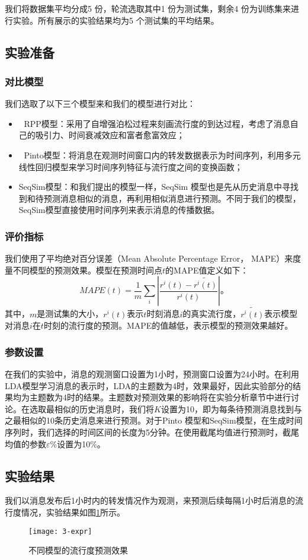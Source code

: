 我们将数据集平均分成5 份，轮流选取其中1 份为测试集，剩余4 份为训练集来进行实验。所有展示的实验结果均为5 个测试集的平均结果。
\subsection{实验准备}
\subsubsection{对比模型}
我们选取了以下三个模型来和我们的模型进行对比：
\begin{itemize}
\item 	RPP模型\citep{shen2014modeling}：采用了自增强泊松过程来刻画流行度的到达过程，考虑了消息自己的吸引力、时间衰减效应和富者愈富效应；
\item 	Pinto模型\citep{pinto2013using}：将消息在观测时间窗口内的转发数据表示为时间序列，利用多元线性回归模型来学习时间序列特征与流行度之间的变换函数；
\item SeqSim模型：和我们提出的模型一样，SeqSim 模型也是先从历史消息中寻找到和待预测消息相似的消息，再利用相似消息进行预测。不同于我们的模型，SeqSim模型直接使用时间序列来表示消息的传播数据。
\end{itemize}
\subsubsection{评价指标}
我们使用了平均绝对百分误差（Mean Absolute Percentage Error， MAPE）来度量不同模型的预测效果。模型在预测时间点$t$的MAPE值定义如下：
 \begin{displaymath}
 MAPE(t)=\frac{1}{m}\sum_{i} |\frac{r^i (t)-\widetilde{r^i (t)}}{r^i (t)}|\text{。}
 \end{displaymath}
其中，$m$是测试集的大小，$r^i (t)$表示$t$时刻消息$i$的真实流行度，$\widetilde{r^i (t)}$表示模型对消息$i$在$t$时刻的流行度的预测。MAPE的值越低，表示模型的预测效果越好。
\subsubsection{参数设置}
在我们的实验中，消息的观测窗口设置为1小时，预测窗口设置为24小时。在利用LDA模型学习消息的表示时，LDA的主题数为4时，效果最好，因此实验部分的结果均为主题数为4时的结果。主题数对预测效果的影响将在实验分析章节中进行讨论。在选取最相似的历史消息时，我们将$K$设置为10，即为每条待预测消息找到与之最相似的10条历史消息来进行预测。对于Pinto 模型和SeqSim模型，在生成时间序列时，我们选择的时间区间的长度为5分钟。在使用截尾均值进行预测时，截尾均值的参数$\varepsilon$\%设置为10\%。
\subsection{实验结果}
我们以消息发布后1小时内的转发情况作为观测，来预测后续每隔1小时后消息的流行度情况，实验结果如图\ref{fig:exprResult}所示。
\begin{figure}[!htbp]
  \centering
  \texttt{[image: 3-expr]}
  \caption{不同模型的流行度预测效果}
  \label{fig:exprResult}
\end{figure}


